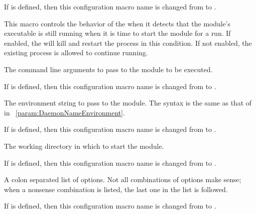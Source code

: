 \begin{description}
    If 
    is defined, then this configuration macro name is changed from
     to
    .

    This macro controls the behavior of the  when it
    detects that the module's executable is still running when it is time
    to start the module for a run. 	If enabled, the
     will kill and restart the process in this
    condition.  If not enabled, the existing process is allowed to
    continue running. 

\item[\Macro{STARTD\_CRON\_<ModuleName>\_ARGS}]
\label{param:StartdCronModuleArgs}
    The command line arguments to pass to the module to be executed. 

    If 
    is defined, then this configuration macro name is changed from
     to
    .

\item[\Macro{STARTD\_CRON\_<ModuleName>\_ENV}]
\label{param:StartdCronModuleEnv}
    The environment string to pass to the module.
    The syntax is the same as that of 
     in ~\ref{param:DaemonNameEnvironment}.

    If 
    is defined, then this configuration macro name is changed from
     to
    .

\item[\Macro{STARTD\_CRON\_<ModuleName>\_CWD}]
\label{param:StartdCronModuleCwd}
    The working directory in which to start the module.

    If 
    is defined, then this configuration macro name is changed from
     to
    .

\item[\Macro{STARTD\_CRON\_<ModuleName>\_OPTIONS}]
\label{param:StartdCronModuleOptions}
    A colon separated list of options. 
    Not all combinations of options make sense;
    when a nonsense combination is listed,
    the last one in the list is followed.

    If 
    is defined, then this configuration macro name is changed from
     to
    .


\end{description}
